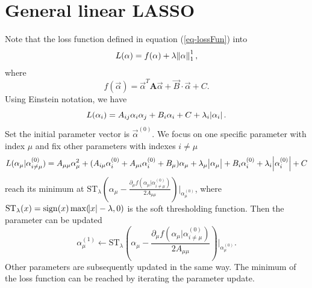 \documentclass[twocolumn]{aastex62}
\begin{document}
\section{General linear LASSO}
Note that the loss function defined in equation (\ref{eq-lossFun}) into
\begin{equation}
L(\alpha)=f(\alpha) +\lambda \norm{\alpha}^1_1,
\end{equation}
where
\begin{equation}
f(\vec{\alpha}) = \vec{\alpha}^T \mathbf{A} \vec{\alpha} + \vec{B} \cdot \vec{\alpha} +C.
\end{equation}
Using Einstein notation, we have
\begin{equation}
L(\alpha_i) = A_{ij} \alpha_i \alpha_j + B_{i} \alpha_i + C +\lambda_i \abs{\alpha_i}.
\end{equation}
Set the initial parameter vector is $\vec{\alpha}^{(0)}$. We focus on one specific parameter with index $\mu$ and fix other parameters with indexes $i \neq \mu$
\begin{equation}
L(\alpha_\mu| \alpha^{(0)}_{i\neq\mu})=A_{\mu\mu} \alpha_\mu^2 + (A_{i\mu}\alpha^{(0)}_i+A_{\mu i}\alpha^{(0)}_i +B_\mu) \alpha_\mu +\lambda_\mu \abs{\alpha_\mu} +B_i \alpha^{(0)}_i + \lambda_i \abs{\alpha^{(0)}_i} +C
\end{equation}
reach its minimum at $\mathrm{ST}_{\lambda} (\alpha_\mu -\frac{\partial_\mu f(\alpha_\mu| \alpha^{(0)}_{i\neq\mu})}{2A_{\mu\mu}}) |_{\alpha_\mu^{(0)}}$,
where $\mathrm{ST}_{\lambda} (x) = \mathrm{sign} (x) \max (\abs{x}-\lambda,0)$ is the soft thresholding function. Then the parameter can be updated
\begin{equation}
\alpha^{(1)}_\mu \leftarrow \mathrm{ST}_{\lambda} (\alpha_\mu -\frac{\partial_\mu f(\alpha_\mu| \alpha^{(0)}_{i\neq\mu})}{2A_{\mu\mu}}) |_{\alpha_\mu^{(0)}}.
\end{equation}
Other parameters are subsequently updated in the same way. The minimum of the loss function can be reached by iterating the parameter update.
\end{document}
